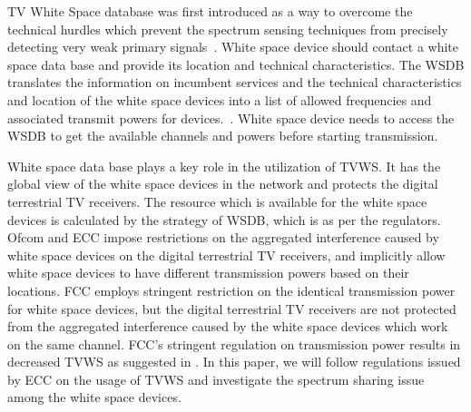 \documentclass[times]{ettauth}
\theoremstyle{mytheoremstyle}
\theoremstyle{mytheoremstyle}
\theoremstyle{mytheoremstyle}
\begin{document}
TV White Space database was first introduced as a way to overcome the technical hurdles which prevent the spectrum sensing techniques from precisely detecting very weak primary signals~\cite{Mwangoka2011DySPAN}.
White space device should contact a white space data base and provide its location and technical characteristics.
The WSDB translates the information on incumbent services and the technical characteristics and location of the white space devices into a list of allowed frequencies and associated transmit powers for devices.~\cite{ECC236}.
White space device needs to access the WSDB to get the available channels and powers before starting transmission.

White space data base plays a key role in the utilization of TVWS.
It has the global view of the white space devices in the network and protects the digital terrestrial TV receivers.
The resource which is available for the white space devices is calculated by the strategy of WSDB, which is as per the regulators.
Ofcom and ECC impose restrictions on the aggregated interference caused by white space devices on the digital terrestrial TV receivers, and implicitly allow white space devices to have different transmission powers based on their locations.
FCC employs stringent restriction on the identical transmission power for white space devices, but the digital terrestrial TV receivers are not protected from the aggregated interference caused by the white space devices which work on the same channel. 
FCC's stringent regulation on transmission power results in decreased TVWS as suggested in \cite{Harrison2012Dyspan}.
%
In this paper, we will follow regulations issued by ECC on the usage of TVWS and investigate the spectrum sharing issue among the white space devices.





\end{document}

